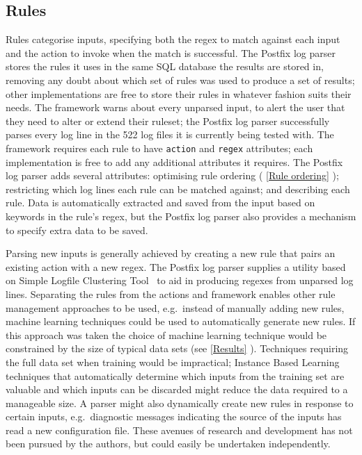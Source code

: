 \documentclass{svmult}
\newcommand{\sectionref}[1]{%
    \textsection{}\vref*{#1}%
}
\newcommand{\numberOFlogFILESall}[0]{%
    522%
}
\begin{document}
\subsection{Rules}

\label{Rules}

Rules categorise inputs, specifying both the regex to match against each
input and the action to invoke when the match is successful.  The Postfix
log parser stores the rules it uses in the same SQL database the results
are stored in, removing any doubt about which set of rules was used to
produce a set of results; other implementations are free to store their
rules in whatever fashion suits their needs.  The framework warns about
every unparsed input, to alert the user that they need to alter or extend
their ruleset; the Postfix log parser successfully parses every log line in
the \numberOFlogFILESall{} log files it is currently being tested with.
The framework requires each rule to have \texttt{action} and \texttt{regex}
attributes; each implementation is free to add any additional attributes it
requires.  The Postfix log parser adds several attributes: optimising rule
ordering (\sectionref{Rule ordering}); restricting which log lines each
rule can be matched against; and describing each rule.  Data is
automatically extracted and saved from the input based on keywords in the
rule's regex, but the Postfix log parser also provides a mechanism to
specify extra data to be saved.

Parsing new inputs is generally achieved by creating a new rule that pairs
an existing action with a new regex.  The Postfix log parser supplies a
utility based on Simple Logfile Clustering Tool~\cite{slct-paper} to aid in
producing regexes from unparsed log lines.  Separating the rules from the
actions and framework enables other rule management approaches to be used,
e.g.\ instead of manually adding new rules, machine learning techniques
could be used to automatically generate new rules.  If this approach was
taken the choice of machine learning technique would be constrained by the
size of typical data sets (see \sectionref{Results}).  Techniques requiring
the full data set when training would be impractical; Instance Based
Learning~\cite{instance-based-learning} techniques that automatically
determine which inputs from the training set are valuable and which inputs
can be discarded might reduce the data required to a manageable size.  A
parser might also dynamically create new rules in response to certain
inputs, e.g.\ diagnostic messages indicating the source of the inputs has
read a new configuration file.  These avenues of research and development
has not been pursued by the authors, but could easily be undertaken
independently.
\end{document}
